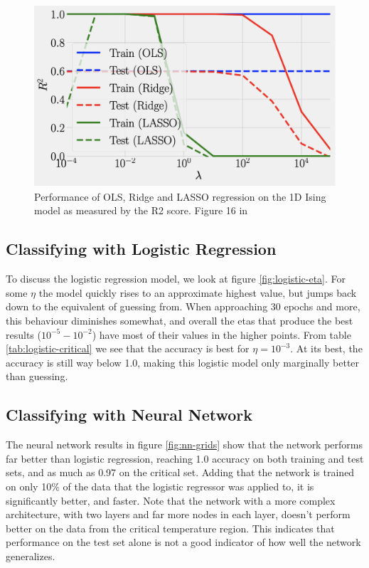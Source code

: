 \begin{figure}[H]
    \centering
\includegraphics[width = 0.6\paperwidth]{figures/R2_article.png}
\caption{Performance of OLS, Ridge and LASSO regression on the 1D Ising model as measured by the 
    R2 score. Figure 16 in \cite{HighBias}} 
\label{fig:regression-r2-article}
\end{figure}
\subsection{Classifying with Logistic Regression}
To discuss the logistic regression model, 
we look at figure \ref{fig:logistic-eta}. For some $\eta$ the model 
quickly rises to an approximate highest value, but jumps back down to 
the equivalent of guessing from. 
When approaching 30 epochs and more, this behaviour 
diminishes somewhat, and overall the etas that produce the best results 
($10^{-5} - 10^{-2}$) have most of their values in the higher points.
From table \ref{tab:logistic-critical} we see that the accuracy is best
for \(\eta = 10^{-3}\). At its best, the accuracy is still 
way below 1.0, making this logistic model only marginally better than guessing. 

\subsection{Classifying with Neural Network}
The neural network results in figure \ref{fig:nn-grids} show that the network
performs far better than logistic regression, reaching 1.0 accuracy on both training and
test sets, and as much as 0.97 on the critical set. Adding that the network is trained
on only 10\% of the data that the logistic regressor was applied to, it is significantly better,
and faster.
Note that the network with a more complex architecture, with two layers and far more nodes in 
each layer, doesn't perform better on the data from the critical temperature region. 
This indicates that performance on the test set alone is not a good indicator of how well
the network generalizes.

